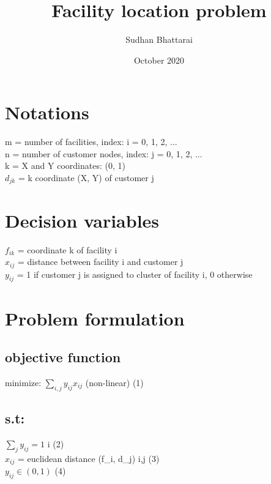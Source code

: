 \documentclass[12pt, letterpaper]{article}
\title{Facility location problem}
\author{Sudhan Bhattarai}
\date{October 2020}
\begin{document}
\maketitle

\section*{Notations}
m = number of facilities, index: i = 0, 1, 2, ... \\
n = number of customer nodes, index: j = 0, 1, 2, ... \\
k = X and Y coordinates: (0, 1) \\
$d_{jk}$ = k coordinate (X, Y) of customer j \\

\section*{Decision variables}
$f_{ik}$ = coordinate k of facility i \\
$x_{ij}$ = distance between facility i and customer j \\
$y_{ij}$ = 1 if customer j is assigned to cluster of facility i, 0 otherwise \\

\section*{Problem formulation}
\subsection*{objective function}
minimize: $\sum_{i,j} y_{ij} x_{ij}$ \hspace{0.5cm} (non-linear) \hfill (1)
\subsection*{s.t:}
$\sum_j y_{ij} = 1$ \hspace{1cm}\forall i \hfill (2) \\
$x_{ij}$ = euclidean distance (f_i, d_j) \hspace{1cm} \forall i,j \hfill (3) \\
$y_{ij} \in (0, 1)$ \hfill (4) \\
\end{document}
